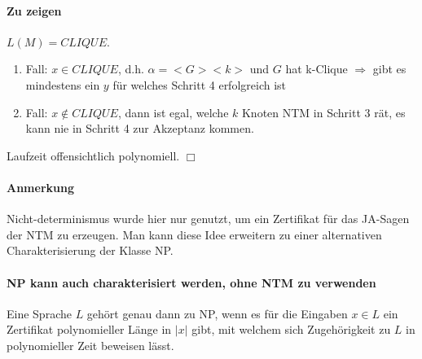 \paragraph*{Zu zeigen} $L(M)=CLIQUE$.
\begin{enumerate}
	\item Fall: $x \in CLIQUE$, d.h. $\alpha=<G><k>$ und $G$ hat k-Clique $\Rightarrow$ gibt es mindestens ein $y$ für welches Schritt 4 erfolgreich ist
	\item Fall: $x \not\in CLIQUE$, dann ist egal, welche $k$ Knoten NTM in Schritt 3 rät, es kann nie in Schritt 4 zur Akzeptanz kommen. %
\end{enumerate}
Laufzeit offensichtlich polynomiell. $\Box$

\paragraph*{Anmerkung} Nicht-determinismus wurde hier nur genutzt, um ein Zertifikat für das JA-Sagen der NTM zu erzeugen. Man kann diese Idee erweitern zu einer alternativen Charakterisierung der Klasse NP.

\paragraph*{NP kann auch charakterisiert werden, ohne NTM zu verwenden} Eine Sprache $L$ gehört genau dann zu NP, wenn es für die Eingaben $x \in L$ ein Zertifikat polynomieller Länge in $|x|$ gibt, mit welchem sich Zugehörigkeit zu $L$ in polynomieller Zeit beweisen lässt.